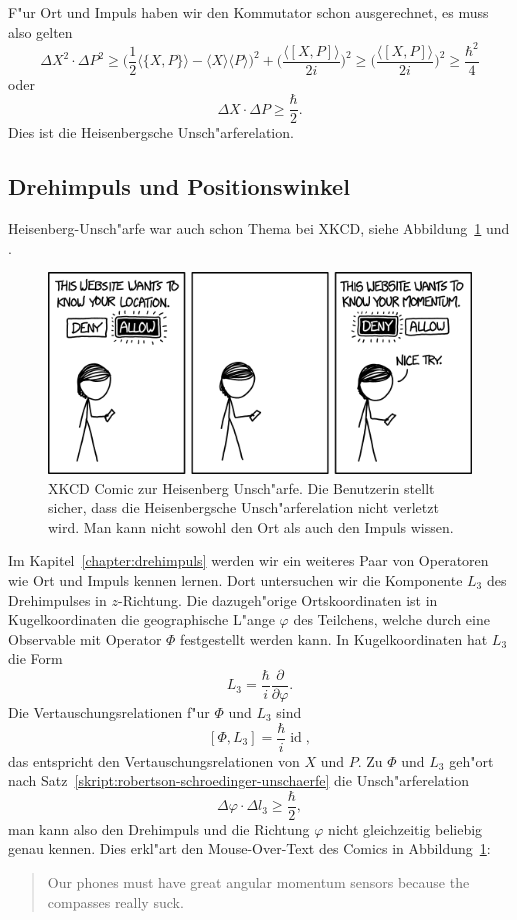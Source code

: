 F"ur Ort und Impuls haben wir den Kommutator schon ausgerechnet, es
muss also gelten
\begin{equation}
\Delta X^2\cdot \Delta P^2
\ge
\biggl(
\frac12\langle \{X,P\}\rangle - \langle X\rangle\langle P\rangle
\biggr)^2
+
\biggl(
\frac{\langle[X,P]\rangle}{2i}
\biggr)^2
\ge
\biggl(
\frac{\langle[X,P]\rangle}{2i}
\biggr)^2
\ge \frac{\hbar^2}4
\end{equation}
oder
\begin{equation}
\Delta X\cdot\Delta P\ge \frac{\hbar}2.
\end{equation}
Dies ist die Heisenbergsche Unsch"arferelation. 

\subsection{Drehimpuls und Positionswinkel}
Heisenberg-Unsch"arfe war auch schon Thema bei XKCD, siehe
Abbildung~\ref{skript:heisenberg:xkcd} und \cite{skript:xkcd}.
\begin{figure}
\centering
\includegraphics[width=0.8\hsize]{images/xkcd-location-sharing.png}
\caption{XKCD Comic zur Heisenberg Unsch"arfe. Die Benutzerin stellt sicher,
dass die Heisenbergsche Unsch"arferelation nicht verletzt wird. Man kann nicht
sowohl den Ort als auch den Impuls wissen.
\label{skript:heisenberg:xkcd}}
\end{figure}
Im Kapitel~\ref{chapter:drehimpuls} werden wir ein weiteres Paar
von Operatoren wie Ort und Impuls kennen lernen.
Dort untersuchen wir die Komponente $L_3$ des Drehimpulses in $z$-Richtung.
Die dazugeh"orige Ortskoordinaten ist in Kugelkoordinaten die geographische 
L"ange $\varphi$ des Teilchens, welche durch eine Observable mit Operator
$\Phi$ festgestellt werden kann.
In Kugelkoordinaten hat $L_3$ die Form
\[
L_3=\frac{\hbar}{i}\frac{\partial}{\partial\varphi}.
\]
Die Vertauschungsrelationen f"ur $\Phi$ und $L_3$ sind
\[
[\Phi,L_3]=\frac{\hbar}{i}\operatorname{id},
\]
das entspricht den Vertauschungsrelationen von $X$ und $P$.
Zu $\Phi$ und $L_3$ geh"ort nach Satz~\ref{skript:robertson-schroedinger-unschaerfe}
die Unsch"arferelation
\[
\Delta\varphi\cdot\Delta l_3 \ge \frac{\hbar}2,
\]
man kann also den Drehimpuls und die Richtung $\varphi$ nicht gleichzeitig
beliebig genau kennen.
Dies erkl"art den Mouse-Over-Text des Comics in
Abbildung~\ref{skript:heisenberg:xkcd}:
\begin{quote}
Our phones must have great angular momentum sensors because
the compasses really suck.
\end{quote}


